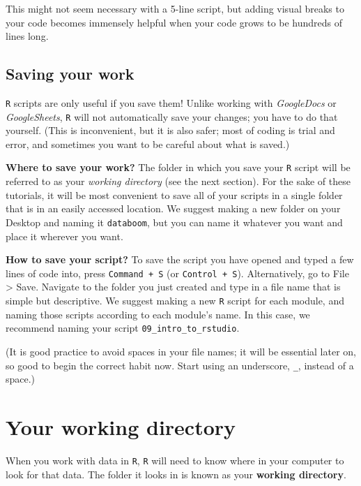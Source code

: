 \documentclass[
]{book}
\begin{document}
This might not seem necessary with a 5-line script, but adding visual breaks to your code becomes immensely helpful when your code grows to be hundreds of lines long.

\hypertarget{saving-your-work}{%
\subsection*{Saving your work}\label{saving-your-work}}

\texttt{R} scripts are only useful if you save them! Unlike working with \emph{GoogleDocs} or \emph{GoogleSheets}, \texttt{R} will not automatically save your changes; you have to do that yourself. (This is inconvenient, but it is also safer; most of coding is trial and error, and sometimes you want to be careful about what is saved.)

\textbf{Where to save your work?} The folder in which you save your \texttt{R} script will be referred to as your \emph{working directory} (see the next section). For the sake of these tutorials, it will be most convenient to save all of your scripts in a single folder that is in an easily accessed location. We suggest making a new folder on your Desktop and naming it \texttt{databoom}, but you can name it whatever you want and place it wherever you want.

\textbf{How to save your script?} To save the script you have opened and typed a few lines of code into, press \texttt{Command\ +\ S} (or \texttt{Control\ +\ S}). Alternatively, go to File \textgreater{} Save. Navigate to the folder you just created and type in a file name that is simple but descriptive. We suggest making a new \texttt{R} script for each module, and naming those scripts according to each module's name. In this case, we recommend naming your script \texttt{09\_intro\_to\_rstudio}.

(It is good practice to avoid spaces in your file names; it will be essential later on, so good to begin the correct habit now. Start using an underscore, \texttt{\_}, instead of a space.)

\hypertarget{your-working-directory}{%
\section*{Your working directory}\label{your-working-directory}}

When you work with data in \texttt{R}, \texttt{R} will need to know where in your computer to look for that data. The folder it looks in is known as your \textbf{working directory}.
\end{document}

